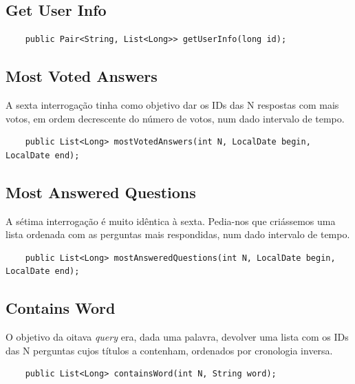 \documentclass[a4paper, 11pt, oneside]{article}
\begin{document}



\subsection{Get User Info}

\begin{lstlisting}
	public Pair<String, List<Long>> getUserInfo(long id);
\end{lstlisting}



\subsection{Most Voted Answers}

A sexta interrogação tinha como objetivo dar os IDs das N respostas com mais votos, em ordem decrescente do número de votos, num dado intervalo de tempo.

\begin{lstlisting}
	public List<Long> mostVotedAnswers(int N, LocalDate begin, LocalDate end);
\end{lstlisting}


\subsection{Most Answered Questions}
A sétima interrogação é muito idêntica à sexta. Pedia-nos que criássemos uma lista ordenada com as perguntas mais respondidas, num dado intervalo de tempo.

\begin{lstlisting}
	public List<Long> mostAnsweredQuestions(int N, LocalDate begin, LocalDate end);
\end{lstlisting}



\subsection{Contains Word}

O objetivo da oitava \textit{query} era, dada uma palavra, devolver uma lista com os IDs das N perguntas cujos títulos a contenham, ordenados por cronologia inversa.

\begin{lstlisting}
	public List<Long> containsWord(int N, String word);
\end{lstlisting}
\end{document}
